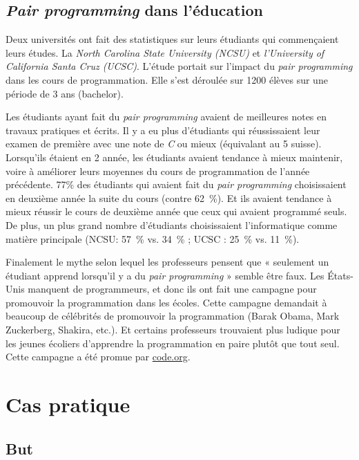 \documentclass[journal, a4paper, frenchb]{IEEEtran}
\begin{document}
\subsection{\emph{Pair programming} dans l’éducation}

Deux universités ont fait des statistiques sur leurs étudiants qui commençaient leurs études. La \emph{North Carolina State University (NCSU)} et \emph{l'University of California Santa Cruz (UCSC)}. L’étude portait sur l’impact du \emph{pair programming} dans les cours de programmation. Elle s’est déroulée sur 1200 élèves sur une période de 3 ans (bachelor).

Les étudiants ayant fait du \emph{pair programming} avaient de meilleures notes en travaux pratiques et écrits. Il y a eu plus d'étudiants qui réussissaient leur examen de première avec une note de \emph{C} ou mieux (équivalant au 5 suisse). Lorsqu’ils étaient en 2\ieme{} année, les étudiants avaient tendance à mieux maintenir, voire à améliorer leurs moyennes du cours de programmation de l’année précédente. 77\% des étudiants qui avaient fait du \emph{pair programming} choisissaient en deuxième année la suite du cours (contre 62~\%). Et ils avaient tendance à mieux réussir le cours de deuxième année que ceux qui avaient programmé seuls. De plus, un plus grand nombre d’étudiants choisissaient l’informatique comme matière principale (NCSU: 57~\% vs. 34~\% ; UCSC : 25~\% vs. 11~\%).
\cite{PPEtude}

Finalement le mythe selon lequel les professeurs pensent que « seulement un étudiant apprend lorsqu’il y a du \emph{pair programming} » semble être faux. Les États-Unis manquent de programmeurs, et donc ils ont fait une campagne pour promouvoir la programmation dans les écoles. Cette campagne demandait à beaucoup de célébrités de promouvoir la programmation (Barak Obama, Mark Zuckerberg, Shakira, etc.). Et certains professeurs trouvaient plus ludique pour les jeunes écoliers d'apprendre la programmation en paire plutôt que  tout seul. Cette campagne a été promue par \url{code.org}.
\cite{PPGril}
\cite{PPBarak}

\section{Cas pratique}

\subsection{But}
\end{document}
